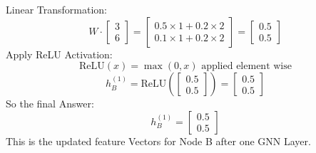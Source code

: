 \documentclass[a4paper,12pt]{article}
\begin{document}
\begin{enumerate}
    Linear Transformation: \\
    \[
    W \cdot \begin{bmatrix} 3 \\ 6 \end{bmatrix} = \begin{bmatrix} 0.5 \times 1 + 0.2 \times 2 \\ 0.1 \times 1 + 0.2 \times 2 \end{bmatrix} = \begin{bmatrix} 0.5 \\ 0.5 \end{bmatrix}
    \]
    Apply ReLU Activation: \\
    \[
    \text{ReLU}(x) = \max(0, x) \text{ applied element wise}
    \]
    \[
    h^{(1)}_B = \text{ReLU} \left( \begin{bmatrix} 0.5 \\ 0.5 \end{bmatrix} \right) = \begin{bmatrix} 0.5 \\ 0.5 \end{bmatrix}
    \]
    So the final Answer: \\
    \[
    h^{(1)}_B = \begin{bmatrix} 0.5 \\ 0.5 \end{bmatrix}
    \]
    This is the updated feature Vectors for Node B after one GNN Layer.
\end{enumerate}
\end{document}
